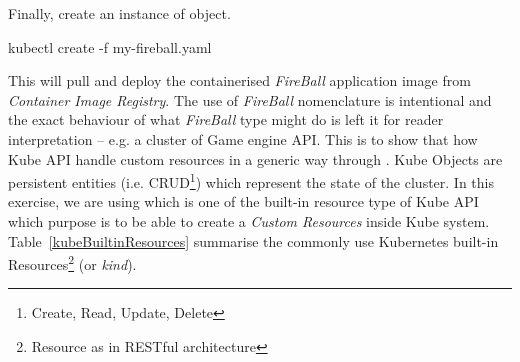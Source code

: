 \noindent Finally, create an instance of  object.
\begin{lcverbatim}
kubectl create -f my-fireball.yaml
\end{lcverbatim}

\noindent This will pull and deploy the containerised \emph{FireBall} application image from \emph{Container Image Registry}. The use of \textit{FireBall} nomenclature is intentional and the exact behaviour of what \emph{FireBall} type might do is left it for reader interpretation -- e.g. a cluster of Game engine API. This is to show that how Kube API handle custom resources in a generic way through . Kube Objects are persistent entities (i.e. CRUD\footnote{Create, Read, Update, Delete}) which represent the state of the cluster. In this exercise, we are using  which is one of the built-in resource type of Kube API which purpose is to be able to create a \textit{Custom Resources} inside Kube system. Table~\ref{kubeBuiltinResources} summarise the commonly use Kubernetes built-in Resources\footnote{Resource as in RESTful architecture} (or \emph{kind}).

